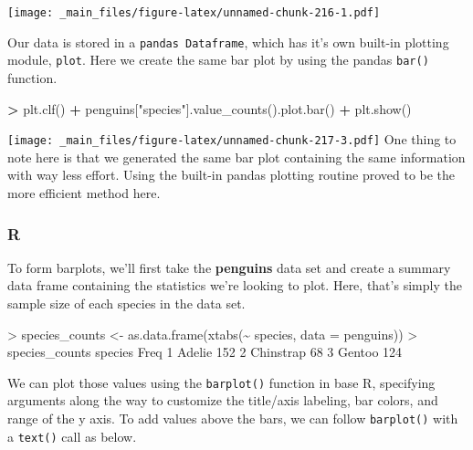\documentclass[
]{book}
\newenvironment{Shaded}{\begin{snugshade}}{\end{snugshade}}
\newcommand{\AttributeTok}[1]{\textcolor[rgb]{0.77,0.63,0.00}{#1}}
\newcommand{\DecValTok}[1]{\textcolor[rgb]{0.00,0.00,0.81}{#1}}
\newcommand{\FunctionTok}[1]{\textcolor[rgb]{0.00,0.00,0.00}{#1}}
\newcommand{\NormalTok}[1]{#1}
\newcommand{\OperatorTok}[1]{\textcolor[rgb]{0.81,0.36,0.00}{\textbf{#1}}}
\newcommand{\OtherTok}[1]{\textcolor[rgb]{0.56,0.35,0.01}{#1}}
\newcommand{\SpecialCharTok}[1]{\textcolor[rgb]{0.00,0.00,0.00}{#1}}
\newcommand{\StringTok}[1]{\textcolor[rgb]{0.31,0.60,0.02}{#1}}
\begin{document}
\texttt{[image: \_main\_files/figure-latex/unnamed-chunk-216-1.pdf]}

Our data is stored in a \texttt{pandas\ Dataframe}, which has it's own built-in plotting module, \texttt{plot}. Here we create the same bar plot by using the pandas \texttt{bar()} function.

\begin{Shaded}
\begin{Highlighting}[]
\OperatorTok{\textgreater{}}\NormalTok{ plt.clf()}
\OperatorTok{+}\NormalTok{ penguins[}\StringTok{"species"}\NormalTok{].value\_counts().plot.bar()}
\OperatorTok{+}\NormalTok{ plt.show()}
\end{Highlighting}
\end{Shaded}

\texttt{[image: \_main\_files/figure-latex/unnamed-chunk-217-3.pdf]}
One thing to note here is that we generated the same bar plot containing the same information with way less effort. Using the built-in pandas plotting routine proved to be the more efficient method here.

\hypertarget{r-39}{%
\subsubsection*{R}\label{r-39}}

To form barplots, we'll first take the \textbf{penguins} data set and create a summary data frame containing the statistics we're looking to plot. Here, that's simply the sample size of each species in the data set.

\begin{Shaded}
\begin{Highlighting}[]
\SpecialCharTok{\textgreater{}}\NormalTok{ species\_counts }\OtherTok{\textless{}{-}} \FunctionTok{as.data.frame}\NormalTok{(}\FunctionTok{xtabs}\NormalTok{(}\SpecialCharTok{\textasciitilde{}}\NormalTok{ species, }\AttributeTok{data =}\NormalTok{ penguins))}
\SpecialCharTok{\textgreater{}}\NormalTok{ species\_counts}
\NormalTok{    species Freq}
\DecValTok{1}\NormalTok{    Adelie  }\DecValTok{152}
\DecValTok{2}\NormalTok{ Chinstrap   }\DecValTok{68}
\DecValTok{3}\NormalTok{    Gentoo  }\DecValTok{124}
\end{Highlighting}
\end{Shaded}

We can plot those values using the \texttt{barplot()} function in base R, specifying arguments along the way to customize the title/axis labeling, bar colors, and range of the y axis. To add values above the bars, we can follow \texttt{barplot()} with a \texttt{text()} call as below.
\end{document}
